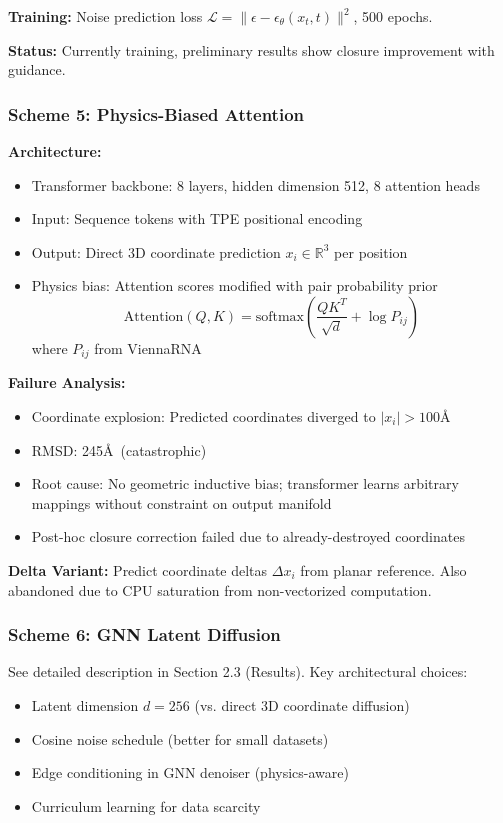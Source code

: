 \documentclass[12pt]{article}
\begin{document}
\textbf{Training:} Noise prediction loss $\mathcal{L} = \|\epsilon - \epsilon_\theta(x_t, t)\|^2$, 500 epochs.

\textbf{Status:} Currently training, preliminary results show closure improvement with guidance.

\subsubsection{Scheme 5: Physics-Biased Attention}

\textbf{Architecture:}
\begin{itemize}
\item Transformer backbone: 8 layers, hidden dimension 512, 8 attention heads
\item Input: Sequence tokens with TPE positional encoding
\item Output: Direct 3D coordinate prediction $x_i \in \mathbb{R}^3$ per position
\item Physics bias: Attention scores modified with pair probability prior
\begin{equation}
\text{Attention}(Q, K) = \text{softmax}\left(\frac{QK^T}{\sqrt{d}} + \log P_{ij}\right)
\end{equation}
where $P_{ij}$ from ViennaRNA
\end{itemize}

\textbf{Failure Analysis:}
\begin{itemize}
\item Coordinate explosion: Predicted coordinates diverged to $|x_i| > 100$\AA
\item RMSD: 245\AA\ (catastrophic)
\item Root cause: No geometric inductive bias; transformer learns arbitrary mappings without constraint on output manifold
\item Post-hoc closure correction failed due to already-destroyed coordinates
\end{itemize}

\textbf{Delta Variant:} Predict coordinate deltas $\Delta x_i$ from planar reference. Also abandoned due to CPU saturation from non-vectorized computation.

\subsubsection{Scheme 6: GNN Latent Diffusion}

See detailed description in Section 2.3 (Results). Key architectural choices:
\begin{itemize}
\item Latent dimension $d=256$ (vs. direct 3D coordinate diffusion)
\item Cosine noise schedule (better for small datasets)
\item Edge conditioning in GNN denoiser (physics-aware)
\item Curriculum learning for data scarcity
\end{itemize}
\end{document}
